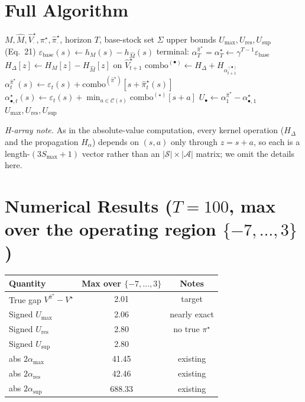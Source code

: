 \documentclass[11pt]{article}
\newcommand{\Smax}{S_{\max}}
\newcommand{\Vhat}{\hat V}
\newcommand{\pihat}{\hat\pi}
\begin{document}
\section{Full Algorithm}
\begin{algorithm}[H]
\caption{Signed sample-path bound (Extended Thm 3)}
\begin{algorithmic}[1]
\Require $M,\hat M,\Vhat^\star_{\cdot},\pi^\star_{\cdot},\pihat^\star_{\cdot}$, horizon $T$, base-stock set $\Sigma$
\Ensure upper bounds $U_{\max},U_{\mathrm{res}},U_{\sup}$ (Eq.~21)
\State $\varepsilon_{\text{base}}(s)\gets h_M(s)-h_{\hat M}(s)$ 
\State terminal: $\alpha^{\pihat^\star}_T=\alpha^\star_T\gets\gamma^{T-1}\varepsilon_{\text{base}}$
  \State $H_\Delta[z]\gets H_M[z]-H_{\hat M}[z]$ on $\Vhat^\star_{t+1}$ 
  \State $\mathrm{combo}^{(\bullet)}\gets H_\Delta+H_{\alpha^{(\bullet)}_{t+1}}$ 
    \State $\alpha^{\pihat^\star}_t(s)\gets\varepsilon_t(s)+\mathrm{combo}^{(\pihat^\star)}[s+\pihat^\star_t(s)]$ 
    \State $\alpha^\star_{\bullet,t}(s)\gets\varepsilon_t(s)+\min_{a\in\mathcal C(s)}\mathrm{combo}^{(\star)}[s+a]$ 
  \EndFor
\EndFor
\State $U_\bullet\gets\alpha^{\pihat^\star}_1-\alpha^\star_{\bullet,1}$ 
\State \Return $U_{\max},U_{\mathrm{res}},U_{\sup}$
\end{algorithmic}
\end{algorithm}

\noindent\emph{H-array note.} As in the absolute-value computation, every kernel
operation ($H_\Delta$ and the propagation $H_\alpha$) depends on $(s,a)$ only
through $z=s+a$, so each is a length-$(3\Smax+1)$ vector rather than an
$|\mathcal S|\times|\mathcal A|$ matrix; we omit the details here.

\section{Numerical Results ($T=100$, max over the operating region $\{-7,\dots,3\}$)}
\begin{center}
\begin{tabular}{lcc}
\toprule
Quantity & Max over $\{-7,\dots,3\}$ & Notes\\
\midrule
True gap $V^{\pihat^\star}-V^\star$ & 2.01 & target\\
\midrule
Signed $U_{\max}$  & 2.06 & nearly exact\\
Signed $U_{\mathrm{res}}$ & 2.80 & no true $\pi^\star$\\
Signed $U_{\sup}$  & 2.80 & \\
\midrule
abs $2\alpha_{\max}$ & 41.45 & existing\\
abs $2\alpha_{\mathrm{res}}$ & 42.46 & existing\\
abs $2\alpha_{\sup}$ & 688.33 & existing\\
\bottomrule
\end{tabular}
\end{center}
\end{document}
